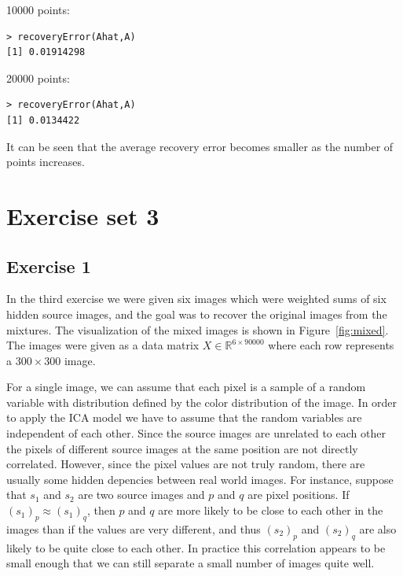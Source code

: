 \documentclass{article}
\begin{document}
10000 points:
\begin{verbatim}
> recoveryError(Ahat,A)
[1] 0.01914298
\end{verbatim}
20000 points:
\begin{verbatim}
> recoveryError(Ahat,A)
[1] 0.0134422
\end{verbatim}
It can be seen that the average recovery error becomes smaller as the number of points increases.

\section{Exercise set 3}

\subsection{Exercise 1}

In the third exercise we were given six images which were weighted sums of six hidden source images, and the goal was to recover the original images from the mixtures.
The visualization of the mixed images is shown in Figure~\ref{fig:mixed}. The images were given as a data matrix $X\in\mathbb{R}^{6\times 90000}$ where each row represents a $300\times 300$ image.

For a single image, we can assume that each pixel is a sample of a random variable with distribution defined by the color distribution of the image.
In order to apply the ICA model we have to assume that the random variables are independent of each other.
Since the source images are unrelated to each other the pixels of different source images at the same position are not directly correlated.
However, since the pixel values are not truly random, there are usually some hidden depencies between real world images.
For instance, suppose that $s_1$ and $s_2$ are two source images and $p$ and $q$ are pixel positions.
If $(s_1)_p\approx(s_1)_q$, then $p$ and $q$ are more likely to be close to each other in the images than if the values are very different, and thus $(s_2)_p$ and $(s_2)_q$ are also likely to be quite close to each other.
In practice this correlation appears to be small enough that we can still separate a small number of images quite well.
\end{document}

